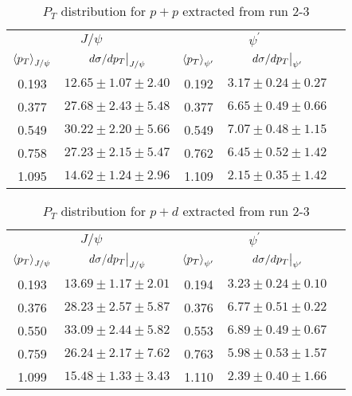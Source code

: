 \documentclass[../main.tex]{subfiles}
\begin{document}
\begin{table}[h!]
\centering
\caption{$P_T$ distribution for $p+p$ extracted from run 2-3}
\begin{tabular}{cc|ccc}
\multicolumn{2}{c|}{$J/\psi$}                               & \multicolumn{2}{c}{$\psi^{\prime}$}                                &  \\ \cline{1-4}
$\expval{p_T}_{J/\psi}$    & $\eval{d\sigma/dp_T}_{J/\psi}$ & $\expval{p_T}_{\psi^\prime}$ & $\eval{d\sigma/dp_T}_{\psi^\prime}$ &  \\ \cline{1-4}
\multicolumn{1}{c|}{0.193} & $12.65\pm1.07\pm2.40$          & \multicolumn{1}{c|}{0.192}   & $3.17\pm0.24\pm0.27$                &  \\
\multicolumn{1}{c|}{0.377} & $27.68\pm2.43\pm5.48$          & \multicolumn{1}{c|}{0.377}   & $6.65\pm0.49\pm0.66$                &  \\
\multicolumn{1}{c|}{0.549} & $30.22\pm2.20\pm5.66$          & \multicolumn{1}{c|}{0.549}   & $7.07\pm0.48\pm1.15$                &  \\
\multicolumn{1}{c|}{0.758} & $27.23\pm2.15\pm5.47$          & \multicolumn{1}{c|}{0.762}   & $6.45\pm0.52\pm1.42$                &  \\
\multicolumn{1}{c|}{1.095} & $14.62\pm1.24\pm2.96$          & \multicolumn{1}{c|}{1.109}   & $2.15\pm0.35\pm1.42$                &  \\ \cline{1-4}
\end{tabular}
\end{table}
\begin{table}[h!]
\centering
\caption{$P_T$ distribution for $p+d$ extracted from run 2-3}
\begin{tabular}{cc|ccc}
\multicolumn{2}{c|}{$J/\psi$}                               & \multicolumn{2}{c}{$\psi^{\prime}$}                                &  \\ \cline{1-4}
$\expval{p_T}_{J/\psi}$    & $\eval{d\sigma/dp_T}_{J/\psi}$ & $\expval{p_T}_{\psi^\prime}$ & $\eval{d\sigma/dp_T}_{\psi^\prime}$ &  \\ \cline{1-4}
\multicolumn{1}{c|}{0.193} & $13.69\pm1.17\pm2.01$          & \multicolumn{1}{c|}{0.194}   & $3.23\pm0.24\pm0.10$                &  \\
\multicolumn{1}{c|}{0.376} & $28.23\pm2.57\pm5.87$          & \multicolumn{1}{c|}{0.376}   & $6.77\pm0.51\pm0.22$                &  \\
\multicolumn{1}{c|}{0.550} & $33.09\pm2.44\pm5.82$          & \multicolumn{1}{c|}{0.553}   & $6.89\pm0.49\pm0.67$                &  \\
\multicolumn{1}{c|}{0.759} & $26.24\pm2.17\pm7.62$          & \multicolumn{1}{c|}{0.763}   & $5.98\pm0.53\pm1.57$                &  \\
\multicolumn{1}{c|}{1.099} & $15.48\pm1.33\pm3.43$          & \multicolumn{1}{c|}{1.110}   & $2.39\pm0.40\pm1.66$                &  \\ \cline{1-4}
\end{tabular}
\end{table}
\end{document}

